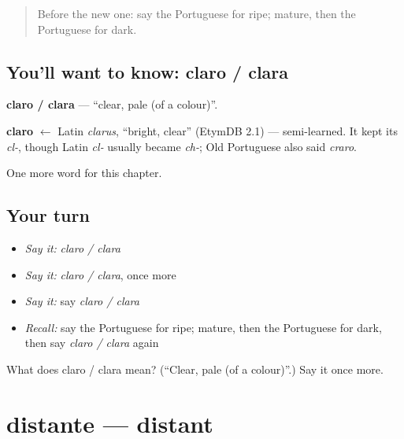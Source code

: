 \label{lesson:PT-C242-claro-clara}



\begin{quote}
Before the new one: say the Portuguese for ripe; mature, then the Portuguese for dark.
\end{quote}

\subsection*{You'll want to know: claro / clara}
\textbf{claro / clara} — \textquotedblleft{}clear, pale (of a colour)\textquotedblright{}.

\begin{cousinweb}
\textbf{claro} $\leftarrow$ Latin \emph{clarus}, \textquotedblleft{}bright, clear\textquotedblright{} (EtymDB 2.1) — semi-learned. It kept its \emph{cl-}, though Latin \emph{cl-} usually became \emph{ch-}; Old Portuguese also said \emph{craro}.
\end{cousinweb}

\begin{grammarlens}[title={What you've built}]
One more word for this chapter.
\end{grammarlens}

\subsection*{Your turn}
\begin{itemize}
\raggedright
  \item \emph{Say it:} \emph{claro / clara}
  \item \emph{Say it:} \emph{claro / clara}, once more
  \item \emph{Say it:} say \emph{claro / clara}
  \item \emph{Recall:} say the Portuguese for ripe; mature, then the Portuguese for dark, then say \emph{claro / clara} again
\end{itemize}

\begin{tcolorbox}[breakable,colback=teal!4,colframe=teal!35!black,title={Before you move on}]
What does claro / clara mean? (\textquotedblleft{}Clear, pale (of a colour)\textquotedblright{}.) Say it once more.
\end{tcolorbox}
\section[distante]{distante — distant}

